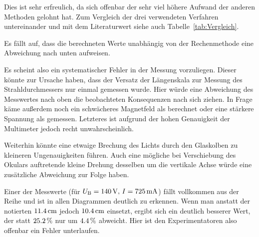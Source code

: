 Dies ist sehr erfreulich, da sich offenbar der sehr viel höhere Aufwand der anderen Methoden gelohnt hat.
Zum Vergleich der drei verwendeten Verfahren untereinander und mit dem Literaturwert siehe auch Tabelle~\ref{tab:Vergleich}.

Es fällt auf, dass die berechneten Werte unabhängig von der Rechenmethode eine Abweichung nach unten aufweisen.

Es scheint also ein systematischer Fehler in der Messung vorzuliegen.
Dieser könnte zur Ursache haben, dass der Versatz der Längenskala zur Messung des Strahldurchmessers nur einmal gemessen wurde.
Hier würde eine Abweichung des Messwertes nach oben die beobachteten Konsequenzen nach sich ziehen.
In Frage käme außerdem noch ein schwächeres Magnetfeld als berechnet oder eine stärkere Spannung als gemessen.
Letzteres ist aufgrund der hohen Genauigkeit der Multimeter jedoch recht unwahrscheinlich.


Weiterhin könnte eine etwaige Brechung des Lichts durch den Glaskolben zu kleineren Ungenauigkeiten führen.
Auch eine mögliche bei Verschiebung des Okulars auftretende kleine Drehung desselben um die vertikale Achse würde eine zusätzliche Abweichung zur Folge haben.

Einer der Messwerte (für $U_\mathrm{B} = \unit[140]{V},\,I = \unit[725]{mA}$) fällt vollkommen aus der Reihe und ist in allen Diagrammen deutlich zu erkennen. Wenn man anstatt der notierten $\unit[11.4]{cm}$ jedoch $\unit[10.4]{cm}$ einsetzt, ergibt sich ein deutlich besserer Wert, der statt $\unit[25.2]{\%}$ nur um $\unit[4.4]{\%}$ abweicht. Hier ist den Experimentatoren also offenbar ein Fehler unterlaufen.
